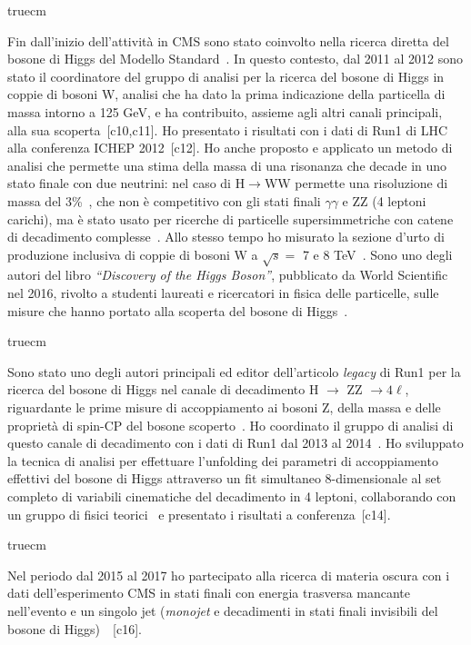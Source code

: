 \documentclass[11pt,twoside,a4paper]{article}
\begin{document}
 truecm

Fin dall'inizio dell'attivit\`a in CMS sono stato coinvolto nella
ricerca diretta del bosone di Higgs del Modello
Standard~\cite{Chatrchyan:2011tz,Chatrchyan:2012tx,Chatrchyan:2012ty}. In
questo contesto, dal 2011 al 2012 sono stato il coordinatore del
gruppo di analisi per la ricerca del bosone di Higgs in coppie di
bosoni W, analisi che ha dato la prima indicazione della particella di
massa intorno a 125 GeV, e ha contribuito, assieme agli altri canali
principali, alla sua
scoperta~\cite{Chatrchyan:2012ufa,Chatrchyan:2013lba,Chatrchyan:2012ufa}[c10,c11].
Ho presentato i risultati con i dati di Run1 di LHC alla conferenza
ICHEP 2012~[c12]. Ho anche proposto e applicato un metodo di analisi
che permette una stima della massa di una risonanza che decade in uno
stato finale con due neutrini: nel caso di H$\to$WW permette una
risoluzione di massa del 3\%~\cite{Chatrchyan:2013iaa}, che non \`e
competitivo con gli stati finali $\gamma\gamma$ e ZZ (4 leptoni
carichi), ma \`e stato usato per ricerche di particelle
supersimmetriche con catene di decadimento
complesse~\cite{Khachatryan:2016epu}. Allo stesso tempo ho misurato la
sezione d'urto di produzione inclusiva di coppie di bosoni W a
$\sqrt{s}=$ 7 e 8 TeV~\cite{Chatrchyan:2013yaa}. Sono uno degli autori
del libro \textit{``Discovery of the Higgs Boson''}, pubblicato da World
Scientific nel 2016, rivolto a studenti laureati e ricercatori in
fisica delle particelle, sulle misure che hanno portato alla scoperta
del bosone di Higgs~\cite{Nisati:2017cst}.

 truecm

Sono stato uno degli autori principali ed editor dell'articolo
\textit{legacy} di Run1 per la ricerca del bosone di Higgs nel canale
di decadimento H $\to$ ZZ $\to 4\ell$, riguardante le prime misure di
accoppiamento ai bosoni Z, della massa e delle propriet\`a di spin-CP
del bosone scoperto~\cite{Chatrchyan:2013mxa}. Ho coordinato il gruppo
di analisi di questo canale di decadimento con i dati di Run1 dal 2013
al 2014~\cite{Khachatryan:2014kca}. Ho sviluppato la tecnica di
analisi per effettuare l'unfolding dei parametri di accoppiamento
effettivi del bosone di Higgs attraverso un fit simultaneo
8-dimensionale al set completo di variabili cinematiche del
decadimento in 4 leptoni, collaborando con un gruppo di fisici
teorici~\cite{Chen:2014pia} e presentato i risultati a
conferenza~[c14].

 truecm

Nel periodo dal 2015 al 2017 ho partecipato alla ricerca di materia
oscura con i dati dell'esperimento CMS in stati finali con energia
trasversa mancante nell'evento e un singolo jet (\textit{monojet} e
decadimenti in stati finali invisibili del bosone di
Higgs)~\cite{Sirunyan:2017hci,Sirunyan:2017jix}~[c16].
\end{document}
